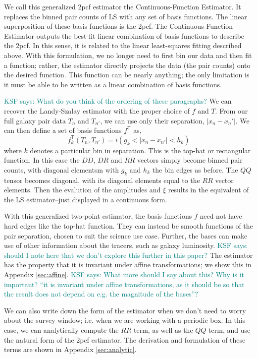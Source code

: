 \documentclass[modern]{aastex62}
\newcommand{\cf}{2pcf\xspace} %
\newcommand{\Est}{The Continuous-Function Estimator\xspace}
\newcommand{\est}{the Continuous-Function Estimator\xspace}
\newcommand{\LS}{LS\xspace}
\newcommand{\T}{^{\mathsf{T}}}
\newcommand{\KSF}[1]{\textcolor{teal}{KSF says: #1}}
\begin{document}
We call this generalized \cf estimator \est.
It replaces the binned pair counts of \LS with any set of basis functions. 
The linear superposition of these basis functions is the \cf.
\Est outputs the best-fit linear combination of basis functions to describe the \cf.
In this sense, it is related to the linear least-squares fitting described above.
With this formulation, we no longer need to first bin our data and then fit a function; rather, the estimator directly projects the data (the pair counts) onto the desired function.
This function can be nearly anything; the only limitation is it must be able to be written as a linear combination of basis functions.

\KSF{What do you think of the ordering of these paragraphs?}
We can recover the Landy-Szalay estimator with the proper choice of $f$ and $T$.
From our full galaxy pair data $T_n$ and $T_{n'}$, we can use only their separation,  $|x_n - x_n'|$.
We can then define a set of basis functions $f\T$ as,
\begin{equation}
f\T_k(T_n, T_{n'}) =  i(g_k < |x_n - x_{n'}| < h_k)
\end{equation}
where $k$ denotes a particular bin in separation.
This is the top-hat or rectangular function.
In this case the $DD$, $DR$ and $RR$ vectors simply become binned pair counts, with diagonal elementsm with $g_k$ and $h_k$ the bin edges as before.
The $QQ$ tensor becomes diagonal, with its diagonal elements equal to the $RR$ vector elements.
Then the evalution of the amplitudes and $\xi$ results in the equivalent of the \LS estimator--just displayed in a continuous form.

With this generalized two-point estimator, the basis functions $f$ need not have hard edges like the top-hat function.
They can instead be smooth functions of the pair separation, chosen to suit the science use case.
Further, the bases can make use of other information about the tracers, such as galaxy luminosity.
\KSF{should I note here that we don't explore this further in this paper?}
The estimator has the property that it is invariant under affine transformations; we show this in Appendix \ref{sec:affine}. \KSF{What more should I say about this? Why is it important? ``it is invariant under affine transformations, as it should be so that the result does not depend on e.g. the magnitude of the bases''?}

We can also write down the form of the estimator when we don't need to worry about the survey window; i.e. when we are working with a periodic box.
In this case, we can analytically compute the $RR$ term, as well as the $QQ$ term, and use the natural form of the \cf estimator.
The derivation and formulation of these terms are shown in Appendix \ref{sec:analytic}.
\end{document}
